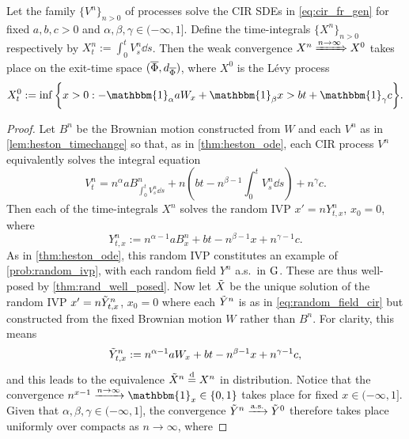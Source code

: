 \begin{theorem}\label{thm:cir_fr_limits}
    Let the family $\{V^n\}_{n>0}$ of processes solve the CIR SDEs in \autoref{eq:cir_fr_gen} for fixed $a,b,c > 0$ and $\alpha,\beta,\gamma\in(-\infty,1]$. Define the time-integrals $\{X^n\}_{n>0}$ respectively by $X^n_t:=\int_0^t V^n_s\dd s$. Then the weak convergence $X^n\xRightarrow{n\to\infty} X^0$ takes place on the exit-time space $(\overline{\Phi},d_{\overline{\Phi}})$, where $X^0$ is the L\'evy process
    \begin{equation}\label{eq:lim_def}
        X^0_t := \inf\bigg\{ x>0: - \mathbbm{1}_\alpha a W_x + \mathbbm{1}_\beta x > bt + \mathbbm{1}_\gamma c \bigg\}.
    \end{equation}
\end{theorem}
\begin{proof}
    Let $B^n$ be the Brownian motion constructed from $W$ and each $V^n$ as in \autoref{lem:heston_timechange} so that, as in \autoref{thm:heston_ode}, each CIR process $V^n$ equivalently solves the integral equation
    \begin{equation}
        V^n_t = n^\alpha a B^n_{\int_0^t V^n_s\dd s} + n \left(b t - n^{\beta-1}\int_0^t V^n_s\dd s\right) + n^\gamma c.
    \end{equation}
    Then each of the time-integrals $X^n$ solves the random IVP $x'=n Y^n_{t,x}$, $x_0=0$, where
    \begin{equation}\label{eq:random_field_cir}
        Y^n_{t,x} := n^{\alpha-1} a B^n_x + bt - n^{\beta-1}x + n^{\gamma-1}c.
    \end{equation}
    As in \autoref{thm:heston_ode}, this random IVP constitutes an example of \autoref{prob:random_ivp}, with each random field $Y^n$ a.s.~in $\mathrm{G}$. These are thus well-posed by \autoref{thm:rand_well_posed}. Now let $\tilde{X}$ be the unique solution of the random IVP $x'=n {\tilde{Y}}^n_{t,x}$, $x_0=0$ where each ${\tilde{Y}}^n$ is as in \autoref{eq:random_field_cir} but constructed from the fixed Brownian motion $W$ rather than $B^n$. For clarity, this means~
    \begin{equation}\label{eq:random_field_cir2}
        {\tilde{Y}}^n_{t,x} := n^{\alpha-1}a W_x + bt - n^{\beta-1}x + n^{\gamma-1}c,
    \end{equation}
    and this leads to the equivalence $\tilde{X}^n\stackrel{\mathrm{d}}{=} X^n$ in distribution. Notice that the convergence $n^{x-1}\xrightarrow{n\to\infty}\mathbbm{1}_x\in\{0,1\}$ takes place for fixed $x\in(-\infty,1]$. Given that $\alpha,\beta,\gamma\in(-\infty,1]$, the convergence ${\tilde{Y}}^n\xrightarrow{\mathrm{a.s.}}{\tilde{Y}}^0$ therefore takes place uniformly over compacts as $n\to\infty$, where

\end{proof}
